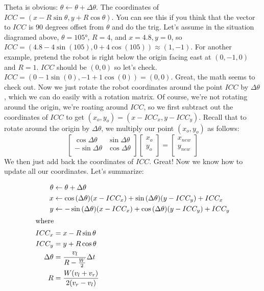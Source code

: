 \documentclass{article}
\begin{document}
Theta is obvious: $\theta \leftarrow \theta+\Delta\theta$. The coordinates of $ICC = (x-R\sin{\theta}, y+R\cos{\theta})$. You can see this if you think that the vector to $ICC$ is 90 degrees offset from $\theta$ and do the trig. Let's assume in the situation diagramed above, $\theta=\ang{105}$, $R=4$, and $x=4.8, y=0$, so $ICC = (4.8-4\sin{(105)}, 0+4\cos{(105)}) \approx (1, -1)$. For another example, pretend the robot is right below the origin facing east at $(0,-1,0)$ and $R=1$. $ICC$ should be $(0,0)$ so let's check. $ICC = (0-1\sin{(0)}, -1+1\cos{(0)}) = (0, 0).$ Great, the math seems to check out. Now we just rotate the robot coordinates around the point $ICC$ by $\Delta\theta$, which we can do easily with a rotation matrix. Of course, we're not rotating around the origin, we're roating around $ICC$, so we first subtract out the coordinates of $ICC$ to get $(x_o, y_o) = (x- ICC_x, y-ICC_y)$. Recall that to rotate around the origin by $\Delta\theta$, we multiply our point $(x_o, y_o)$ as follows:
\begin{equation}
  \begin{bmatrix}
    \cos{\Delta\theta} & \sin{\Delta\theta} \\
    -\sin{\Delta\theta} & \cos{\Delta\theta} \\
  \end{bmatrix}
  \begin{bmatrix}
    x_o \\
    y_o \\
  \end{bmatrix}
  =
  \begin{bmatrix}
    x_{new} \\
    y_{new} \\
  \end{bmatrix}
\end{equation}
We then just add back the coordinates of $ICC$. Great! Now we know how to update all our coordinates. Let's summarize:

\begin{align}
 \theta &\leftarrow \theta + \Delta\theta \\
  x &\leftarrow \cos{(\Delta\theta)}(x-ICC_x)+\sin{(\Delta\theta)}(y-ICC_y) + ICC_x \\
  y &\leftarrow -\sin{(\Delta\theta)}(x-ICC_x)+\cos{(\Delta\theta)}(y-ICC_y) + ICC_y \\
\shortintertext{where}
  ICC_x &= x-R\sin{\theta} \\
  ICC_y &= y+R\cos{\theta} \\
  \Delta\theta &= \dfrac{v_l}{R-\frac{W}{2}}\Delta t \\
  R &= \frac{W(v_l+v_r)}{2(v_r-v_l)}
\end{align}
\end{document}
